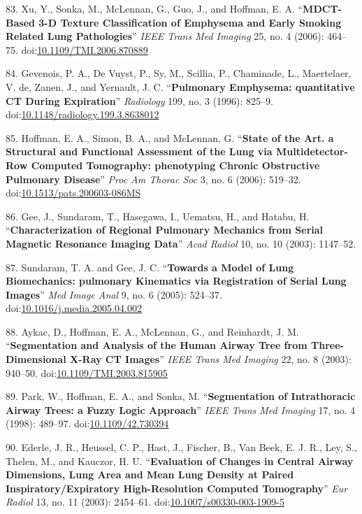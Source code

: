 \documentclass[11pt,]{article}
\begin{document}
83. Xu, Y., Sonka, M., McLennan, G., Guo, J., and Hoffman, E. A.
``\textbf{MDCT-Based 3-D Texture Classification of Emphysema and Early
Smoking Related Lung Pathologies}'' \emph{IEEE Trans Med Imaging} 25,
no. 4 (2006): 464--75.
doi:\href{http://dx.doi.org/10.1109/TMI.2006.870889}{10.1109/TMI.2006.870889}

84. Gevenois, P. A., De Vuyst, P., Sy, M., Scillia, P., Chaminade, L.,
Maertelaer, V. de, Zanen, J., and Yernault, J. C. ``\textbf{Pulmonary
Emphysema: quantitative CT During Expiration}'' \emph{Radiology} 199,
no. 3 (1996): 825--9.
doi:\href{http://dx.doi.org/10.1148/radiology.199.3.8638012}{10.1148/radiology.199.3.8638012}

85. Hoffman, E. A., Simon, B. A., and McLennan, G. ``\textbf{State of
the Art. a Structural and Functional Assessment of the Lung via
Multidetector-Row Computed Tomography: phenotyping Chronic Obstructive
Pulmonary Disease}'' \emph{Proc Am Thorac Soc} 3, no. 6 (2006): 519--32.
doi:\href{http://dx.doi.org/10.1513/pats.200603-086MS}{10.1513/pats.200603-086MS}

86. Gee, J., Sundaram, T., Hasegawa, I., Uematsu, H., and Hatabu, H.
``\textbf{Characterization of Regional Pulmonary Mechanics from Serial
Magnetic Resonance Imaging Data}'' \emph{Acad Radiol} 10, no. 10 (2003):
1147--52.

87. Sundaram, T. A. and Gee, J. C. ``\textbf{Towards a Model of Lung
Biomechanics: pulmonary Kinematics via Registration of Serial Lung
Images}'' \emph{Med Image Anal} 9, no. 6 (2005): 524--37.
doi:\href{http://dx.doi.org/10.1016/j.media.2005.04.002}{10.1016/j.media.2005.04.002}

88. Aykac, D., Hoffman, E. A., McLennan, G., and Reinhardt, J. M.
``\textbf{Segmentation and Analysis of the Human Airway Tree from
Three-Dimensional X-Ray CT Images}'' \emph{IEEE Trans Med Imaging} 22,
no. 8 (2003): 940--50.
doi:\href{http://dx.doi.org/10.1109/TMI.2003.815905}{10.1109/TMI.2003.815905}

89. Park, W., Hoffman, E. A., and Sonka, M. ``\textbf{Segmentation of
Intrathoracic Airway Trees: a Fuzzy Logic Approach}'' \emph{IEEE Trans
Med Imaging} 17, no. 4 (1998): 489--97.
doi:\href{http://dx.doi.org/10.1109/42.730394}{10.1109/42.730394}

90. Ederle, J. R., Heussel, C. P., Hast, J., Fischer, B., Van Beek, E.
J. R., Ley, S., Thelen, M., and Kauczor, H. U. ``\textbf{Evaluation of
Changes in Central Airway Dimensions, Lung Area and Mean Lung Density at
Paired Inspiratory/Expiratory High-Resolution Computed Tomography}''
\emph{Eur Radiol} 13, no. 11 (2003): 2454--61.
doi:\href{http://dx.doi.org/10.1007/s00330-003-1909-5}{10.1007/s00330-003-1909-5}
\end{document}
